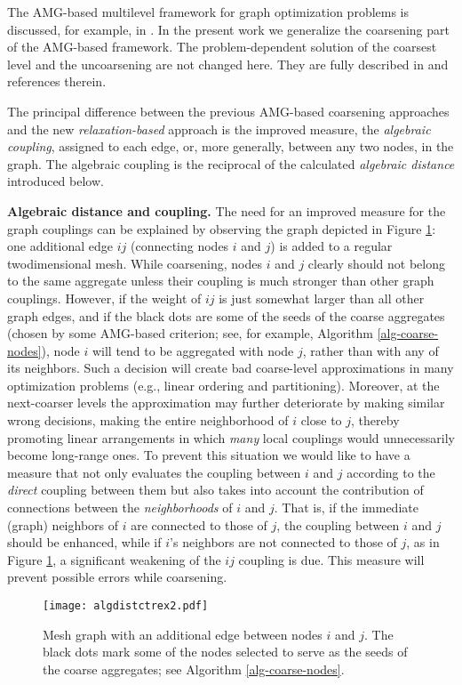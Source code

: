 \documentclass[final]{siamltex}
\begin{document}
\par The AMG-based multilevel framework for graph optimization problems is discussed, for example, in \cite{safro2005}.
In the present work we generalize the coarsening part of the AMG-based
framework. The problem-dependent solution of the coarsest level
and the uncoarsening are not changed here. They are
fully described in \cite{safro2005} and references therein.
\par The principal difference between the previous AMG-based coarsening approaches
\cite{safro2005,Hu01amultilevel,cheval-mlpartcompar}
and the new {\it relaxation-based} approach is the improved
measure, the {\it algebraic coupling},
assigned to each edge, or, more generally, between any two nodes, in the graph. The algebraic
coupling is the reciprocal of the calculated {\it algebraic distance}
introduced below.
\par {\bf Algebraic distance and coupling.} The need for an improved
measure for the graph couplings can be explained by observing the
graph depicted in Figure \ref{fig:meshexample}: one additional edge
$ij$ (connecting nodes $i$ and $j$) is added to a regular twodimensional mesh. While coarsening, nodes $i$
and $j$ clearly should not belong to the same aggregate unless their coupling
is much stronger than other graph couplings. However, if the
weight of $ij$ is just somewhat larger than all other graph edges, and if the
black dots are some of the seeds of the coarse aggregates (chosen
by some AMG-based criterion; see, for example, Algorithm \ref{alg-coarse-nodes}), node $i$ will
tend to be aggregated with node $j$, rather than with any of its neighbors.
Such a decision will create bad coarse-level approximations
in many optimization problems (e.g., linear ordering and
partitioning). Moreover, at the next-coarser levels the approximation
may further deteriorate by making similar wrong decisions, making the entire neighborhood of $i$ close to $j$, thereby promoting linear arrangements in which {\it many} local couplings would unnecessarily become long-range ones. To
prevent this situation we would like to have a measure that not only
evaluates the coupling between $i$ and $j$ according to
the {\it direct} coupling between them but also takes into
account the contribution of connections between the {\it
neighborhoods} of $i$ and $j$. That is, if the immediate (graph)
neighbors of $i$ are connected to those of $j$,
the coupling between $i$ and $j$ should be enhanced, while if
$i$'s neighbors are not connected to those of $j$, as in Figure
\ref{fig:meshexample}, a significant weakening of the
$ij$ coupling is due. This
measure will prevent possible errors while coarsening.
\begin{figure}[h]
\centering
\texttt{[image: algdistctrex2.pdf]}
\caption{Mesh graph with an additional edge between nodes $i$
and $j$. The black dots mark some of the nodes selected to serve
as the seeds of the coarse aggregates; see Algorithm \ref{alg-coarse-nodes}.}\label{fig:meshexample}
\end{figure}
\end{document}
